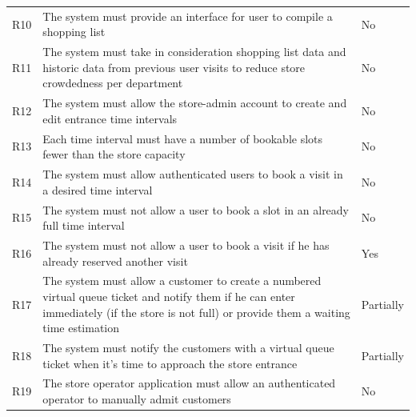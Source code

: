 \begin{tabular}{C{1cm}L{11cm}C{3.1cm}}
    R10   & The system must provide an interface for user to compile a shopping list  & No                                                                                                                  \\
    R11   & The system must take in consideration shopping list data and historic data from previous user visits to reduce store crowdedness per department & No                                            \\
    R12   & The system must allow the store-admin account to create and edit entrance time intervals & No                                                                                                   \\
    R13   & Each time interval must have a number of bookable slots fewer than the store capacity & No                                                                                                      \\
    R14   & The system must allow authenticated users to book a visit in a desired time interval & No                                                                                                        \\
    R15   & The system must not allow a user to book a slot in an already full time interval     & No                                                                                                       \\
    R16   & The system must not allow a user to book a visit if he has already reserved another visit  & Yes                                                                                                 \\
    R17   & The system must allow a customer to create a numbered virtual queue ticket and notify them if he can enter immediately (if the store is not full) or provide them a waiting time estimation & Partially\\
    R18   & The system must notify the customers with a virtual queue ticket when it's time to approach the store entrance  & Partially                                                                            \\
    R19   & The store operator application must allow an authenticated operator to manually admit customers & No                                                                                            \\
\end{tabular}

\vfill

